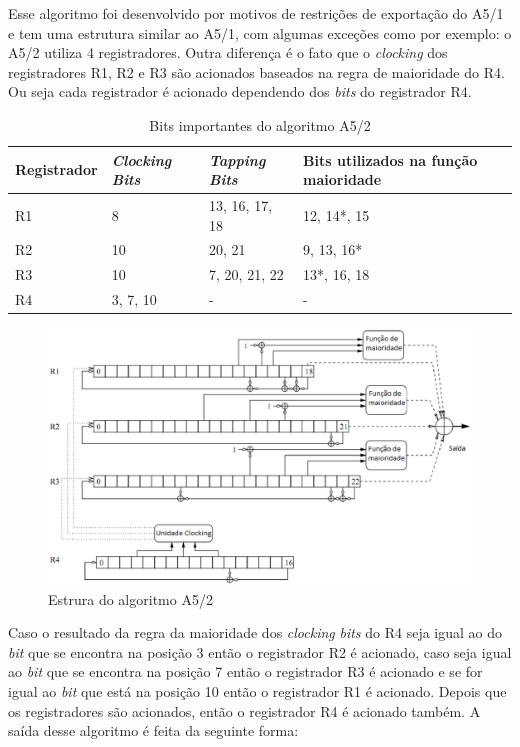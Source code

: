 Esse algoritmo foi desenvolvido por motivos de restrições de exportação do A5/1 e tem uma estrutura similar ao A5/1, com algumas exceções como por exemplo: o A5/2 utiliza 4 registradores. Outra diferença é o fato que o \textit{clocking} dos registradores R1, R2 e R3 são acionados baseados na regra de maioridade do R4. Ou seja cada registrador é acionado dependendo dos \textit{bits} do registrador R4. 

\begin{table}[h]
\centering
	\begin{tabular}{|l|l|l|l|}
		\hline
		Registrador & \textit{Clocking Bits} & \textit{Tapping Bits} & Bits utilizados na função maioridade \\ \hline
		R1 & 8 & 13, 16, 17, 18  & 12, 14*\protect\footnotemark , 15\\ \hline
		R2 & 10 & 20, 21 & 9, 13, 16*\\ \hline
		R3 & 10 & 7, 20, 21, 22 & 13*, 16, 18\\ \hline	
		R4 & 3, 7, 10 & - & -\\ \hline
	\end{tabular}
	\caption{Bits importantes do algoritmo A5/2}
\end{table}
\begin{figure}[h]
\centering
\includegraphics[keepaspectratio=true,scale=0.5]
    {figuras/a5_2.eps}
    \caption[Estrura do algoritmo A5/2]{Estrura do algoritmo A5/2\protect\footnotemark } 
\end{figure}

Caso o resultado da regra da maioridade dos \textit{clocking} \textit{bits} do R4 seja igual ao do \textit{bit} que se encontra na posição 3 então o registrador R2 é acionado, caso seja igual ao \textit{bit} que se encontra na posição 7 então o registrador R3 é acionado e se for igual ao \textit{bit} que está na posição 10 então o registrador R1 é acionado. Depois que os registradores são acionados, então o registrador R4 é acionado também. A saída desse algoritmo é feita da seguinte forma:

